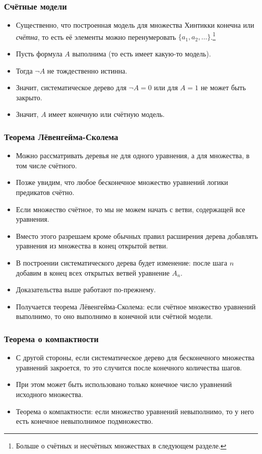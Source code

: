 \documentclass[10pt]{beamer}
\begin{document}
\begin{frame}
    \frametitle{Счётные модели}
    \begin{itemize}
        \item Существенно, что построенная модель для множества Хинтикки конечна или \emph{счётна}, то есть её элементы можно перенумеровать $\{a_1,a_2,\ldots\}$.\footnote{Больше о счётных и несчётных множествах в следующем разделе.}
        \item Пусть формула $A$ выполнима (то есть имеет какую-то модель). 
        \item Тогда $\neg A$ не тождественно истинна.
        \item Значит, систематическое дерево для $\neg A = 0$ или для $A = 1$ не может быть закрыто.
        \item Значит, $A$ имеет конечную или счётную модель.
    \end{itemize}
\end{frame}

\begin{frame}
    \frametitle{Теорема Лёвенгейма-Сколема}
    \begin{itemize}
        \item Можно рассматривать деревья не для одного уравнения, а для множества, в том числе счётного.
        \item Позже увидим, что любое бесконечное множество уравнений логики предикатов счётно.
        \item Если множество счётное, то мы не можем начать с ветви, содержащей все уравнения.
        \item Вместо этого разрешаем кроме обычных правил расширения дерева добавлять уравнения из множества в конец открытой ветви.
        \item В построении систематического дерева будет изменение: после шага $n$ добавим в конец всех открытых ветвей уравнение $A_n$.
        \item Доказательства выше работают по-прежнему.
        \item Получается теорема Лёвенгейма-Сколема: если счётное множество уравнений выполнимо, то оно выполнимо в конечной или счётной модели.
    \end{itemize}
\end{frame}

\begin{frame}
    \frametitle{Теорема о компактности}
    \begin{itemize}
        \item С другой стороны, если систематическое дерево для бесконечного множества уравнений закроется, то это случится после конечного количества шагов.
        \item При этом может быть использовано только конечное число уравнений исходного множества.
        \item Теорема о компактности: если множество уравнений невыполнимо, то у него есть конечное невыполнимое подмножество.
    \end{itemize}
\end{frame}
\end{document}
